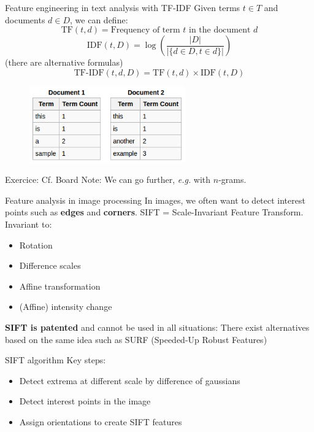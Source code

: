\documentclass{beamer}
\newcommand{\1}[1]{\mathbbm{1}\left[#1\right]}
\begin{document}
\begin{frame}{Feature engineering in text analysis with TF-IDF}
Given terms $t \in T$ and documents $d \in D$, we can define:
$$ \text{TF}(t, d) = \text{Frequency of term } t \text{ in the document } d$$
$$ \text{IDF}(t, D) = \log \left( \dfrac{|D|}{|\{ d \in D, t \in d \}|} \right)$$
(there are alternative formulas)
\pause
$$ \text{TF-IDF}(t, d, D) = \text{TF}(t, d) \times \text{IDF}(t, D) $$
\pause
\begin{figure}
\centering
\includegraphics[width=0.6\textwidth]{images/document_stats.png}
\end{figure}
Exercice: Cf. Board
\pause
Note: We can go further, \textit{e.g.} with $n$-grams.
\end{frame}

\begin{frame}{Feature analysis in image processing}
In images, we often want to detect interest points such as \textbf{edges} and \textbf{corners}.
\vfill
\pause
SIFT = Scale-Invariant Feature Transform. Invariant to:
\begin{itemize}
	\item Rotation
	\item Difference scales
	\item Affine transformation
	\item (Affine) intensity change
\end{itemize}
\vfill
\pause
\textbf{SIFT is patented} and cannot be used in all situations: There exist alternatives based on the same idea such as SURF (Speeded-Up Robust Features)
\end{frame}

\begin{frame}{SIFT algorithm}
Key steps:
\begin{itemize}
	\item Detect extrema at different scale by difference of gaussians
	\item Detect interest points in the image
	\item Assign orientations to create SIFT features
\end{itemize}
\end{frame}
\end{document}
